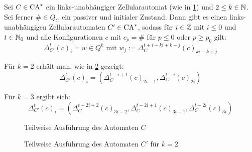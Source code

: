 \begin{lemma}
    \label{linksunabhaengigSpeedup}
    Sei $C \in \textrm{CA}^*$ ein links-unabhängiger Zellularautomat (wie in \cref{fig:LinUnabhSpeedup1}) und $2 \leq k \in \mathbb{N}$.
    Sei ferner $\# \in Q_C$ ein passiver und initialer Zustand.
    Dann gibt es einen links-unabhängigen Zellularautomaten
    $C' \in \textrm{CA}^*$, sodass für $i \in \mathbb{Z}$ mit $i \leq 0$ und $t \in \mathbb{N}_0$
    und alle Konfigurationen $c$ mit $c_p = \#$ für $p \leq 0$ oder $p \geq p_0$ gilt:
    \[
        \Delta^{t}_{C'}(c)_i =
            w \in Q^k
            \text{ mit } w_j := \Delta^{ t + i - ki+k-j }_C(c)_{ ki-k+j }
    \]
    
    Für $k = 2$ erhält man, wie in \cref{fig:LinUnabhSpeedup2} gezeigt:
    \[
        \Delta^{t}_{C'}(c)_i = ( \Delta^{ t - i+1 }_C(c)_{ 2i-1 },
            \Delta^{ t - i }_C(c)_{ 2i })
    \]

    Für $k = 3$ ergibt sich:
    \[
        \Delta^{t}_{C'}(c)_i = ( \Delta^{t-2i+2}_C(c)_{3i-2},
        \Delta^{t-2i+1}_C(c)_{3i-1},
        \Delta^{t-2i}_C(c)_{3i}
        )
    \]
    
    \begin{figure}[!ht]
        \centering
        
        \caption{Teilweise Ausführung des Automaten $C$}
        \label{fig:LinUnabhSpeedup1}
    \end{figure}
    \begin{figure}[!ht]
        \centering
        
        \caption{Teilweise Ausführung des Automaten $C'$ für $k = 2$}
        \label{fig:LinUnabhSpeedup2}
    \end{figure}
    
\end{lemma}
